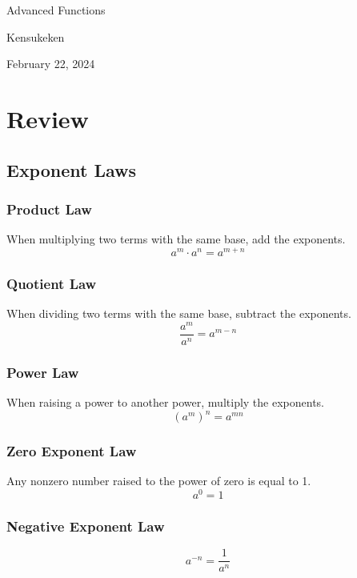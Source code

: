 \documentclass{article}
\begin{document}
\begin{titlepage}
    \centering
    \vspace*{2cm}
    {\LARGE \textcolor{lessoncolor}{Advanced Functions}}\par
    \vspace{1cm}
    {\large Kensukeken}\par
    \vspace{2cm}
    {\large February 22, 2024}\par
    \vspace{3cm}
\end{titlepage}
\tableofcontents
\newpage


\section*{Review}
\subsection{Exponent Laws}
 
\subsubsection*{Product Law}
When multiplying two terms with the same base, add the exponents.
\[ a^m \cdot a^n = a^{m + n} \]

\subsubsection*{Quotient Law}
When dividing two terms with the same base, subtract the exponents.
\[ \frac{a^m}{a^n} = a^{m - n} \]

\subsubsection*{Power Law}
When raising a power to another power, multiply the exponents.
\[ (a^m)^n = a^{mn} \]

\subsubsection*{Zero Exponent Law}
Any nonzero number raised to the power of zero is equal to 1.
\[ a^0 = 1 \]

\subsubsection*{Negative Exponent Law}
\[ a^{-n} = \frac{1}{a^n} \]
\end{document}
